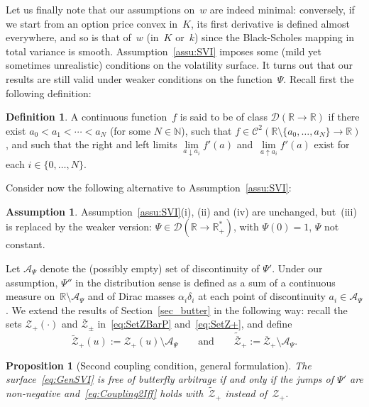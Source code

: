 \documentclass{amsart}[11pt]
\numberwithin{equation}{section}
\newtheorem{proposition}[theorem]{Proposition}
\theoremstyle{definition}
\newtheorem{definition}[theorem]{Definition}
\newtheorem{assumption}[theorem]{Assumption}
\newcommand{\RR}{\mathbb{R}}
\newcommand{\Zz}{\mathcal{Z}}
\begin{document}
Let us finally note that our assumptions on~$w$ are indeed minimal: 
conversely, if we start from an option price convex in~$K$,
its first derivative is defined almost everywhere, and so is that of~$w$ (in~$K$ or~$k$) 
since the Black-Scholes mapping in total variance is smooth.
Assumption~\ref{assu:SVI} imposes some (mild yet sometimes unrealistic) conditions on the volatility surface.
It turns out that our results are still valid under weaker conditions on the function~$\Psi$.
Recall first the following definition:
\begin{definition}\label{def}
A continuous function~$f$ is said to be of class $\mathcal{D}(\RR\to\RR)$ 
if there exist $a_0<a_1<\cdots<a_N$ (for some $N\in\mathbb{N}$),
such that $f \in \mathcal{C}^2(\RR \setminus \{a_0,\ldots,a_N\}\to\RR)$,
and such that the right and left limits
$\lim\limits_{a\downarrow a_i}f'(a)$ and~$\lim\limits_{a\uparrow a_i}f'(a)$ exist for each $i\in\{0,\ldots,N\}$.
\end{definition}
Consider now the following alternative to Assumption~\ref{assu:SVI}:
\begin{assumption}\label{assu:SVIweak}
Assumption~\ref{assu:SVI}(i), (ii) and (iv) are unchanged, but~(iii) is replaced by the weaker version:
$\Psi \in \mathcal{D}(\RR \to \RR_+^*)$, with $\Psi(0)=1$, $\Psi$ not constant.
\end{assumption}

Let $\mathcal{A}_{\Psi}$ denote the (possibly empty) set of discontinuity of $\Psi'$. 
Under our assumption, $\Psi''$ in the distribution sense is defined as a sum of a continuous measure 
on~$\RR\setminus \mathcal{A}_{\Psi}$ and of Dirac masses $\alpha_i \delta_i$ at each point of discontinuity 
$a_i \in \mathcal{A}_{\Psi}$.
We extend the results of Section~\ref{sec_butter} in the following way:
recall the sets $\Zz_+(\cdot)$ and $\overline{\Zz}_\pm$ in~\eqref{eq:SetZBarP} and~\eqref{eq:SetZ+}, 
and define
\begin{equation}\label{eq:SetZweak+}
\widetilde{\Zz}_+(u) := \Zz_+(u)\setminus\mathcal{A}_{\Psi}
\qquad\text{and}\qquad
\widetilde{\overline{\Zz}}_+:=\overline{\Zz}_+\setminus\mathcal{A}_{\Psi}.
\end{equation}
\begin{proposition}[Second coupling condition, general formulation]\label{prop:weak}
The surface~\eqref{eq:GenSVI} is free of butterfly arbitrage if and only if
the jumps of $\Psi'$ are non-negative and~\eqref{eq:Coupling2Iff} holds with~$\widetilde{\Zz}_+$ instead of~$\Zz_+$.
\end{proposition}
\end{document}
